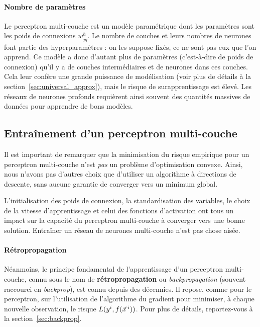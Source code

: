 \paragraph{Nombre de paramètres} Le perceptron multi-couche est un modèle
paramétrique dont les paramètres sont les poids de connexions $w_{jq}^h$. Le
nombre de couches et leurs nombres de neurones font partie des hyperparamètres
: on les suppose fixés, ce ne sont pas eux que l'on apprend. Ce modèle a donc
d'autant plus de paramètres (c'est-à-dire de poids de connexion) qu'il y a de
couches intermédiaires et de neurones dans ces couches. Cela leur confère une
grande puissance de modélisation (voir plus de détails à la
section~\ref{sec:universal_approx}), mais le risque de surapprentissage est
élevé.  Les réseaux de neurones profonds requièrent ainsi souvent des quantités
massives de données pour apprendre de bons modèles.

\subsection{Entraînement d'un perceptron multi-couche}
Il est important de remarquer que la minimisation du risque empirique pour un
perceptron multi-couche n'est {\it pas} un problème d'optimisation
convexe. Ainsi, nous n'avons pas d'autres choix que d'utiliser un algorithme à
directions de descente, sans aucune garantie de converger vers un minimum
global.

L'initialisation des poids de connexion, la standardisation des variables, le
choix de la vitesse d'apprentissage et celui des fonctions d'activation ont
tous un impact sur la capacité du perceptron multi-couche à converger vers une
bonne solution. Entraîner un réseau de neurones multi-couche n'est pas chose
aisée.

\paragraph{Rétropropagation} Néanmoins, le principe fondamental de
l'apprentissage d'un perceptron multi-couche, connu sous le nom de
\textbf{rétropropagation} ou {\it backpropagation} (souvent raccourci en {\it
  backprop}), est connu depuis des décennies. Il repose, comme pour le
perceptron, sur l'utilisation de l'algorithme du
gradient pour minimiser, à chaque nouvelle observation, le risque
$L(y^i, f(\xx^i))$. Pour plus de détails, reportez-vous à la
section~\ref{sec:backprop}.
  
